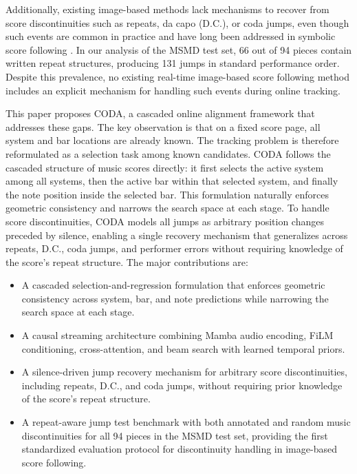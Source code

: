 Additionally, existing image-based methods lack mechanisms to recover from score discontinuities such as repeats, da capo (D.C.), or coda jumps, even though such events are common in practice and have long been addressed in symbolic score following \cite{nakamura2016real,morsi2022bottlenecks,park2025matchmaker}. In our analysis of the MSMD test set, 66 out of 94 pieces contain written repeat structures, producing 131 jumps in standard performance order. Despite this prevalence, no existing real-time image-based score following method includes an explicit mechanism for handling such events during online tracking.

This paper proposes CODA, a cascaded online alignment framework that addresses these gaps. The key observation is that on a fixed score page, all system and bar locations are already known. The tracking problem is therefore reformulated as a selection task among known candidates. CODA follows the cascaded structure of music scores directly: it first selects the active system among all systems, then the active bar within that selected system, and finally the note position inside the selected bar. This formulation naturally enforces geometric consistency and narrows the search space at each stage. To handle score discontinuities, CODA models all jumps as arbitrary position changes preceded by silence, enabling a single recovery mechanism that generalizes across repeats, D.C., coda jumps, and performer errors without requiring knowledge of the score's repeat structure. The major contributions are:
\begin{itemize}
\item A cascaded selection-and-regression formulation that enforces geometric consistency across system, bar, and note predictions while narrowing the search space at each stage.
\item A causal streaming architecture combining Mamba audio encoding, FiLM conditioning, cross-attention, and beam search with learned temporal priors.
\item A silence-driven jump recovery mechanism for arbitrary score discontinuities, including repeats, D.C., and coda jumps, without requiring prior knowledge of the score's repeat structure.
\item A repeat-aware jump test benchmark with both annotated and random music discontinuities for all 94 pieces in the MSMD test set, providing the first standardized evaluation protocol for discontinuity handling in image-based score following.
\end{itemize}

